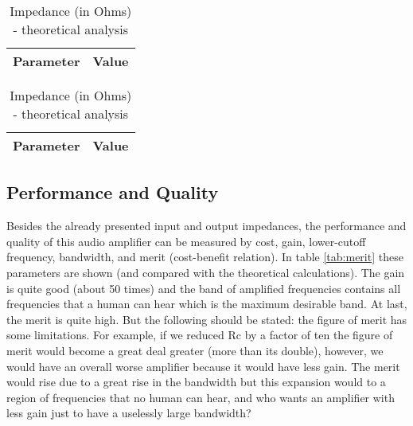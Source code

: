 \begin{table}[!htb]
  \begin{minipage}{.5\linewidth}
     \centering
  \begin{tabular}{|c|c|}
    \hline    
    {\bf Parameter} & {\bf Value} \\ \hline
    
    
 \end{tabular}
 \caption{Impedance (in Ohms) -  simulation analysis}
 \label{tab:z}
  \end{minipage}
    \hspace{2 mm}
    \begin{minipage}{.5\linewidth}
      \centering
        \begin{tabular}{|c|c|}
    \hline    
    {\bf Parameter} & {\bf Value} \\ \hline
     
 \end{tabular}
        \caption{Impedance (in Ohms) - theoretical analysis}
        \label{tab:compz}
    \end{minipage} 
\end{table}


\newpage
\subsection{Performance and Quality}
Besides the already presented input and output impedances, the performance and quality of this audio amplifier can be measured by cost, gain, lower-cutoff frequency, bandwidth, and merit (cost-benefit relation). In table \ref{tab:merit} these parameters are shown (and compared with the theoretical calculations). The gain is quite good (about 50 times) and the band of amplified frequencies contains all frequencies that a human can hear which is the maximum desirable band. At last, the merit is quite high. But the following should be stated: the figure of merit has some limitations. For example, if we reduced Rc by a factor of ten the figure of merit would become a great deal greater (more than its double), however, we would have an overall worse amplifier because it would have less gain. The merit would rise due to a great rise in the bandwidth but this expansion would to a region of frequencies that no human can hear, and who wants an amplifier with less gain just to have a uselessly large bandwidth?


